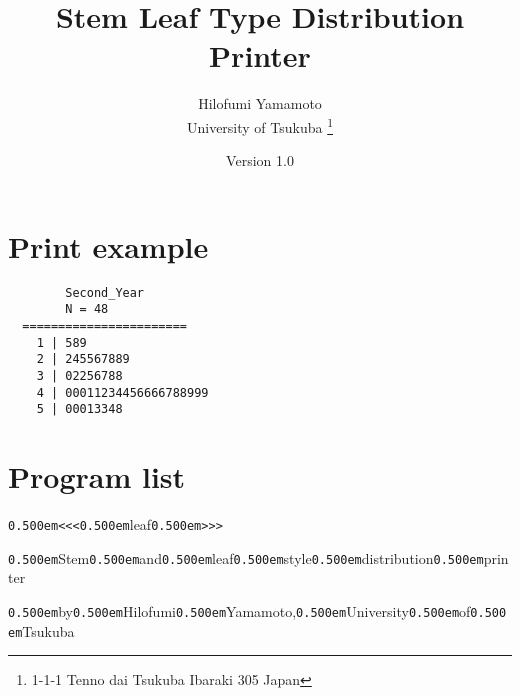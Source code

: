 \documentclass[uplatex,a4paper]{jsarticle}
\begin{document}
\title{Stem Leaf Type Distribution Printer}
\author{Hilofumi Yamamoto \\ University of Tsukuba
        \thanks{1-1-1 Tenno dai Tsukuba Ibaraki 305 Japan}}
\date{Version 1.0}
\maketitle

\section{Print example}

\begin{verbatim}
        Second_Year
        N = 48
  =======================
    1 | 589
    2 | 245567889
    3 | 02256788
    4 | 00011234456666788999
    5 | 00013348
\end{verbatim}

\section{Program list}
\ifx\gtfam\undefined
  \ifx\dm\undefined
    \ifx\tendm\undefined
      \def\mc{\null}
    \else
      \def\mc{\tendm}
    \fi
  \else
    \def\mc{\dm}
  \fi
  \ifx\dg\undefined
    \ifx\tendg\undefined
      \def\gt{\null}
    \else
      \def\gt{\tendg}
    \fi
  \else
    \def\gt{\dg}
  \fi
\fi
\ifx\sc\undefined
  \def\sc{\null}
\fi

\tt\mc 

\noindent
\tt\mc {\tt /}{\tt *}{\tt *}{\tt *}{\tt *}{\tt *}{\tt *}{\tt *}{\tt *}{\tt *}{\tt *}{\tt *}{\tt *}{\tt *}{\tt *}{\tt *}{\tt *}{\tt *}{\tt *}{\tt *}{\tt *}{\tt *}{\tt *}{\tt *}{\tt *}{\tt *}{\tt *}{\tt *}{\tt *}{\tt *}{\tt *}{\tt *}{\tt *}{\tt *}{\tt *}{\tt *}{\tt *}{\tt *}{\tt *}{\tt *}{\tt *}{\tt *}{\tt *}{\tt *}{\tt *}{\tt *}{\tt *}{\tt *}{\tt *}{\tt *}{\tt *}{\tt *}{\tt *}{\tt *}{\tt *}{\tt *}{\tt *}{\tt *}{\tt *}{\tt *}{\tt *}{\tt *}{\tt *}{\tt *}{\tt *}{\tt *}

\noindent
{\tt\mc \kern0.500em}{\tt <}{\tt <}{\tt <}{\tt\mc \kern0.500em}leaf{\tt\mc \kern0.500em}{\tt >}{\tt >}{\tt >}

\noindent
{\tt\mc \kern0.500em}Stem{\tt\mc \kern0.500em}and{\tt\mc \kern0.500em}leaf{\tt\mc \kern0.500em}style{\tt\mc \kern0.500em}distribution{\tt\mc \kern0.500em}printer

\noindent
{\tt\mc \kern0.500em}by{\tt\mc \kern0.500em}Hilofumi{\tt\mc \kern0.500em}Yamamoto,{\tt\mc \kern0.500em}University{\tt\mc \kern0.500em}of{\tt\mc \kern0.500em}Tsukuba
\end{document}
